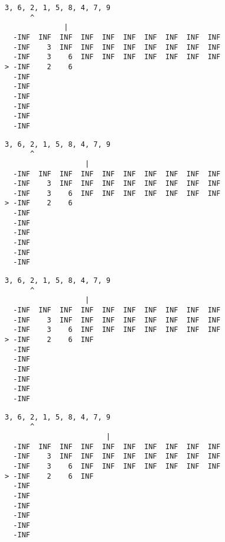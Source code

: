 { \begin{verbatim}
3, 6, 2, 1, 5, 8, 4, 7, 9
      ^
              |
  -INF  INF  INF  INF  INF  INF  INF  INF  INF  INF
  -INF    3  INF  INF  INF  INF  INF  INF  INF  INF
  -INF    3    6  INF  INF  INF  INF  INF  INF  INF
> -INF    2    6                                   
  -INF                                             
  -INF                                             
  -INF                                             
  -INF                                             
  -INF                                             
  -INF                                             
\end{verbatim} }

{ \begin{verbatim}
3, 6, 2, 1, 5, 8, 4, 7, 9
      ^
                   |
  -INF  INF  INF  INF  INF  INF  INF  INF  INF  INF
  -INF    3  INF  INF  INF  INF  INF  INF  INF  INF
  -INF    3    6  INF  INF  INF  INF  INF  INF  INF
> -INF    2    6                                   
  -INF                                             
  -INF                                             
  -INF                                             
  -INF                                             
  -INF                                             
  -INF                                             
\end{verbatim} }

{ \begin{verbatim}
3, 6, 2, 1, 5, 8, 4, 7, 9
      ^
                   |
  -INF  INF  INF  INF  INF  INF  INF  INF  INF  INF
  -INF    3  INF  INF  INF  INF  INF  INF  INF  INF
  -INF    3    6  INF  INF  INF  INF  INF  INF  INF
> -INF    2    6  INF                              
  -INF                                             
  -INF                                             
  -INF                                             
  -INF                                             
  -INF                                             
  -INF                                             
\end{verbatim} }

{ \begin{verbatim}
3, 6, 2, 1, 5, 8, 4, 7, 9
      ^
                        |
  -INF  INF  INF  INF  INF  INF  INF  INF  INF  INF
  -INF    3  INF  INF  INF  INF  INF  INF  INF  INF
  -INF    3    6  INF  INF  INF  INF  INF  INF  INF
> -INF    2    6  INF                              
  -INF                                             
  -INF                                             
  -INF                                             
  -INF                                             
  -INF                                             
  -INF                                             
\end{verbatim} }

